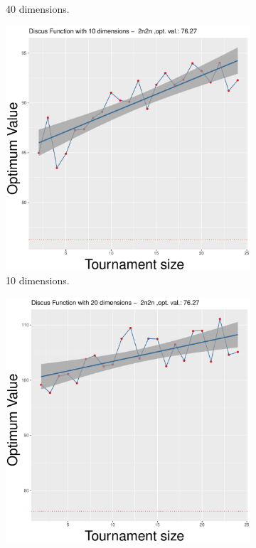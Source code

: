 \begin{figure}[t]
\begin{subfigure}[b]{0.33\textwidth}
		\caption{40 dimensions.}
	\end{subfigure}
	\caption{Average performance on different tournament size for the Discus Function, when using the uniform crossover - ($\lambda, \lambda$) scheme.}
	\label{uniform-11-a}
	\begin{subfigure}[b]{0.33\textwidth}
		\centering
		\includegraphics[width=\textwidth]{img/2n2n-10D/unimodal_2n2n_11_dim_10.pdf}
		\caption{10 dimensions.}
	\end{subfigure}
	\begin{subfigure}[b]{0.33\textwidth}
		\centering
		\includegraphics[width=\textwidth]{img/2n2n-20D/unimodal_2n2n_11_dim_20.pdf}

\end{subfigure}
\end{figure}
